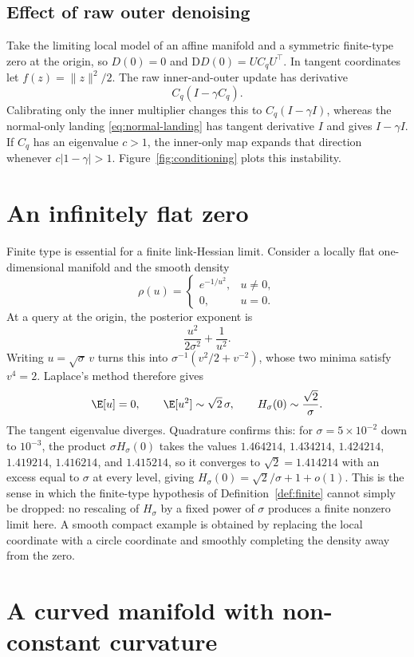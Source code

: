 \subsection{Effect of raw outer denoising}

Take the limiting local model of an affine manifold and a symmetric finite-type zero at the origin, so
$D(0)=0$ and $\mathrm D D(0)=UC_qU^\top$.  In tangent coordinates let
$f(z)=\|z\|^2/2$.  The raw inner-and-outer update has derivative
\[
  C_q(I-\gamma C_q).
\]
Calibrating only the inner multiplier changes this to
$C_q(I-\gamma I)$, whereas the normal-only landing \eqref{eq:normal-landing} has tangent derivative $I$ and gives $I-\gamma I$.  If $C_q$ has an eigenvalue $c>1$, the inner-only map expands that direction whenever $c|1-\gamma|>1$.  Figure~\ref{fig:conditioning} plots this instability.

\section{An infinitely flat zero}
\label{app:flat}

Finite type is essential for a finite link-Hessian limit.  Consider a locally flat one-dimensional manifold and the smooth density
\[
  \rho(u)=
  \begin{cases}
    e^{-1/u^2},&u\ne0,\\
    0,&u=0.
  \end{cases}
\]
At a query at the origin, the posterior exponent is
\[
  \frac{u^2}{2\sigma^2}+\frac1{u^2}.
\]
Writing $u=\sqrt{\sigma}\,v$ turns this into
$\sigma^{-1}(v^2/2+v^{-2})$, whose two minima satisfy
$v^4=2$.  Laplace's method therefore gives
\[
  \E[u]=0,\qquad
  \E[u^2]\sim\sqrt2\,\sigma,\qquad
  H_\sigma(0)\sim\frac{\sqrt2}{\sigma}.
\]
The tangent eigenvalue diverges.  Quadrature confirms this: for
$\sigma=5\times10^{-2}$ down to $10^{-3}$, the product $\sigma H_\sigma(0)$ takes the values
$1.464214$, $1.434214$, $1.424214$, $1.419214$, $1.416214$, and $1.415214$, so it converges to
$\sqrt2=1.414214$ with an excess equal to $\sigma$ at every level, giving
$H_\sigma(0)=\sqrt2/\sigma+1+o(1)$.  This is the sense in which the finite-type
hypothesis of Definition~\ref{def:finite} cannot simply be dropped: no rescaling of
$H_\sigma$ by a fixed power of $\sigma$ produces a finite nonzero limit here.
A smooth compact example is obtained by replacing the local coordinate with a circle coordinate and smoothly completing the density away from the zero.

\section{A curved manifold with non-constant curvature}
\label{app:spiral}

